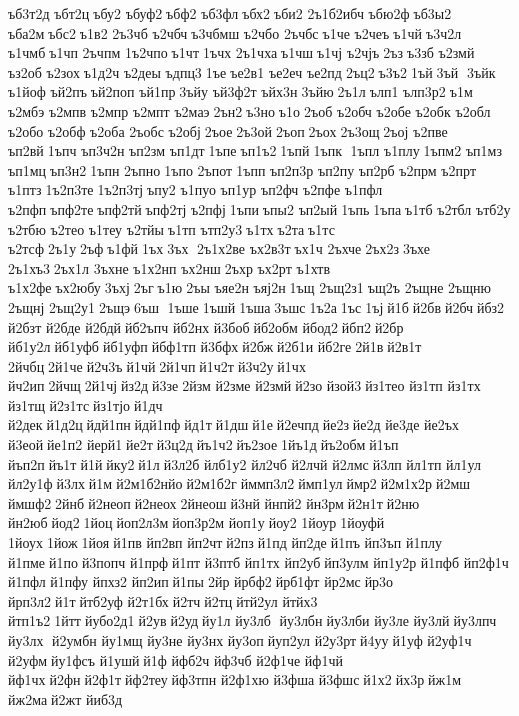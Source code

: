 ъб3т2д 	ъбт2ц ъбу2 	ъбуф2 ъбф2 	ъб3фл ъбх2 ъби2 
2ъ1б2ибч 	ъбю2ф ъб3ы2 	ъба2м ъбс2 ъ1в2 	2ъ3чб  	ъ2чбч ъ3чбмш 	ъ2чбо 	2ъчбс ъ1че 	ъ2чеъ ъ1чй ъ3ч2л 	ъ1чмб ъ1чп 	2ъчпм 
1ъ2чпо ъ1чт 1ъчх 
2ъ1чха ъ1чш ъ1чј 	ъ2чјъ 2ъз ъ3зб 	ъ2змй 	ъз2об 	ъ2зох ъ1д2ч 	ъ2деы 	ъдпц3 1ъе ъе2в1 	ъе2еч 	ъе2пд 2ъц2 ъ3ъ2 1ъй 3ъй  3ъйк  	ъ1йоф 	ъй2пъ ъй2поп 	ъй1пр 3ъйу 
ъй3ф2т 	ъйх3н 3ъйю 2ъ1л ълп1 
ълп3р2 ъ1м 	ъ2мбэ 	ъ2мпв 	ъ2мпр 	ъ2мпт 	ъ2маэ 2ън2 ъ3но ъ1о 2ъоб  	ъ2обч 	ъ2обе 	ъ2обк 	ъ2обл 	ъ2обо 	ъ2обф 	ъ2оба 	2ъобс 	ъ2обј 2ъое 2ъ3ой 2ъоп 2ъох 2ъ3ощ 2ъој 	ъ2пве 	ъп2вй 1ъпч 
ъп3ч2н 	ъп2зм 	ъп1дт 1ъпе ъп1ъ2 1ъпй 1ъпк  1ъпл  	ъ1плу 1ъпм2 	ъп1мз 	ъп1мц ъп3н2 1ъпн  	2ъпно 1ъпо 	2ъпот 1ъпп 
ъп2п3р 	ъп2пу 	ъп2рб 	ъ2прм 	ъ2прт 	ъ1птз 1ъ2п3те 1ъ2п3тј ъпу2 	ъ1пуо 	ъп1ур 	ъп2фч 	ъ2пфе 	ъ1пфл 	ъ2пфп ъпф2те ъпф2тй ъпф2тј 	ъ2пфј 1ъпи ъпы2 	ъп2ый 1ъпь 1ъпа ъ1тб 	ъ2тбл 	ътб2у 	ъ2тбю 	ъ2тео 	ъ1теу 	ъ2тйы ъ1тп 
ътп2у3 ъ1тх ъ2та ъ1тс 	ъ2тсф 2ъ1у 2ъф ъ1фй 1ъх 3ъх  2ъ1х2ве 
ъх2в3т ъх1ч 	2ъхче 2ъх2з 3ъхе 	2ъ1хъ3 2ъх1л 	3ъхне 
ъ1х2нп 	ъх2нш 2ъхр 	ъх2рт 	ъ1хтв 
ъ1х2фе ъх2юбу 3ъхј 2ъг ъ1ю 2ъы 	ъяе2н 	ъяј2н 1ъщ 	2ъщ2з1 ъщ2ъ 	2ъщне 	2ъщню 	2ъщнј 	2ъщ2у1 2ъщэ 6ъш  1ъше 1ъшй 1ъша 3ъшс 1ъ2а 1ъс 1ъј й1б й2бв й2бч йбз2 	й2бзт 	й2бде 	й2бдй йб2ъпч 	йб2нх 	й3боб йб2обм 	йбод2 йбп2 й2бр 
йб1у2л йб1уфб йб1уфп йбф1тп 	й3бфх й2бж й2б1и 	йб2ге 2й1в й2в1т 	2йчбц 2й1че й2ч3ъ й1чй 2й1чп й1ч2т й3ч2у й1чх 	йч2ип 2йчщ 2й1чј йз2д й3зе 2йзм 	й2зме 	й2змй й2зо 	йзой3 йз1тео 	йз1тп 	йз1тх 	йз1тщ 
й2з1тс йз1тјо й1дч 	й2дек й1д2ц йдй1пн йдй1пф йд1т й1дш й1е й2ечпд йе2з йе2д 	йе3де 	йе2ъх 	й3еой йе1п2 	йерй1 йе2т й3ц2д йъ1ч2 йъ2зое 1йъ1д йъ2обм й1ъп 	йъп2п йъ1т й1й йку2 й1л й3л2б 
йлб1у2 	йл2чб 	й2лчй 	й2лмс й3лп 	йл1тп 	йл1ул 
йл2у1ф й3лх й1м й2м1б2нйо й2м1б2г йммп3л2 ймп1ул ймр2 й2м1х2р й2мш 	ймшф2 2йнб й2неоп й2неох 2йнеош й3нй 	йнпй2 	йн3рм й2н1т й2ню 	йн2юб йод2 1йоц йоп2л3м йоп3р2м 	йоп1у йоу2 	1йоур 1йоуфй 	1йоух 1йож 1йоя й1пв 	йп2вп 	йп2чт й2пз й1пд 	йп2де й1пъ 	йп3ъп 	й1плу 	й1пме й1по й3попч 	й1прф й1пт 	й3птб 	йп1тх 	йп2уб йп3улм 
йп1у2р 	й1пфб 
йп2ф1ч 	й1пфл 	й1пфу 	йпхз2 	йп2ип й1пы 2йр 	йрбф2 йрб1фт 	йр2мс йр3о 
йрп3л2 й1т йтб2уф 
й2т1бх й2тч й2тц йтй2ул 	йтйх3 
йтп1ъ2 1йтт йубо2д1 й2ув й2уд йу1л 
йу3лб  йу3лбн йу3лби 	йу3ле 	йу3лй йу3лпч 
йу3лх  й2умбн 	йу1мщ 	йу3не 	йу3нх 	йу3оп йуп2ул 
й2у3рт й4уу й1уф 
й2уф1ч 	й2уфм йу1фсъ 	й1ушй й1ф 	йфб2ч 	йф3чб 
й2ф1че 	йф1чй 	йф1чх й2фн й2ф1т йф2теу йф3тпн 
й2ф1хю 	й3фша 	й3фшс й1х2 йх3р йж1м 	йж2ма й2жт 	йиб3д 
